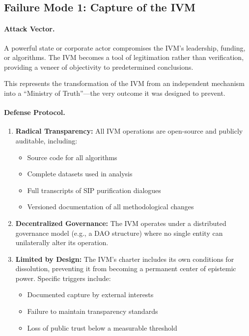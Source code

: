 \documentclass[11pt,a4paper]{article}
\begin{document}
\begin{small}
\subsection{Failure Mode 1: Capture of the IVM}

\paragraph{Attack Vector.} A powerful state or corporate actor compromises the IVM's leadership, funding, or algorithms. The IVM becomes a tool of legitimation rather than verification, providing a veneer of objectivity to predetermined conclusions.

This represents the transformation of the IVM from an independent mechanism into a ``Ministry of Truth''---the very outcome it was designed to prevent.

\paragraph{Defense Protocol.}

\begin{enumerate}
    \item \textbf{Radical Transparency:} All IVM operations are open-source and publicly auditable, including:
    \begin{itemize}
        \item Source code for all algorithms
        \item Complete datasets used in analysis
        \item Full transcripts of SIP purification dialogues
        \item Versioned documentation of all methodological changes
    \end{itemize}
    
    \item \textbf{Decentralized Governance:} The IVM operates under a distributed governance model (e.g., a DAO structure) where no single entity can unilaterally alter its operation.
    
    \item \textbf{Limited by Design:} The IVM's charter includes its own conditions for dissolution, preventing it from becoming a permanent center of epistemic power. Specific triggers include:
    \begin{itemize}
        \item Documented capture by external interests
        \item Failure to maintain transparency standards
        \item Loss of public trust below a measurable threshold
    \end{itemize}
    

\end{enumerate}
\end{small}
\end{document}
